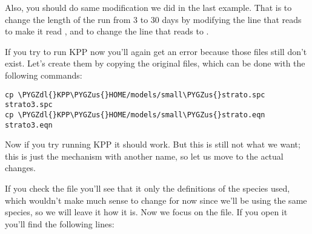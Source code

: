 \documentclass[letterpaper,10pt,openany,oneside]{sphinxmanual}
\def\PYGZus{\char`\_}
\def\PYGZdl{\char`\$}
\begin{document}
Also, you should do same modification we did in the last example. That is to change the
length of the run from 3 to 30 days by modifying the line that reads  to make it read , and to change
the line that reads  to .

If you try to run KPP now you'll again get an error because those
files still don't exist. Let's create them by copying the original 
files, which can be done with the following commands:

\begin{Verbatim}[commandchars=\\\{\}]
cp \PYGZdl{}KPP\PYGZus{}HOME/models/small\PYGZus{}strato.spc strato3.spc
cp \PYGZdl{}KPP\PYGZus{}HOME/models/small\PYGZus{}strato.eqn strato3.eqn
\end{Verbatim}

Now if you try running KPP it should work. But this is still not what we want;
this is just the  mechanism with another name, so let us move to
the actual changes.

If you check the  file you'll see that it only the definitions
of the species used, which wouldn't make much sense to change for now since
we'll be using the same species, so we will leave it how it is. Now we focus on
the  file. If you open it you'll find the following lines:
\end{document}
